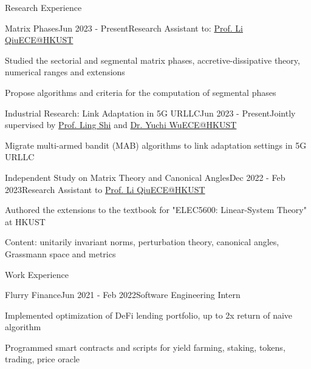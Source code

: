 \documentclass{resume}
\begin{document}
\begin{rSection}{Research Experience}

    \begin{rSubsection}{Matrix Phases}{Jun 2023 - Present}{Research Assistant to: \href{https://eeqiu.people.ust.hk/}{Prof. Li Qiu}}{\href{https://ece.hkust.edu.hk/}{ECE@HKUST}}
        \item Studied the sectorial and segmental matrix phases, accretive-dissipative theory, numerical ranges and extensions
        \item Propose algorithms and criteria for the computation of segmental phases
    \end{rSubsection}

    \begin{rSubsection}{Industrial Research: Link Adaptation in 5G URLLC}{Jun 2023 - Present}{Jointly supervised by \href{https://eesling.home.ece.ust.hk/}{Prof. Ling Shi} and \href{https://ieeexplore.ieee.org/author/37086153473}{Dr. Yuchi Wu}}{\href{https://ece.hkust.edu.hk/}{ECE@HKUST}}
        \item Migrate multi-armed bandit (MAB) algorithms to link adaptation settings in 5G URLLC
    \end{rSubsection}

    \begin{rSubsection}{Independent Study on Matrix Theory and Canonical Angles}{Dec 2022 - Feb 2023}{Research Assistant to \href{https://eeqiu.people.ust.hk/}{Prof. Li Qiu}}{\href{https://ece.hkust.edu.hk/}{ECE@HKUST}}
        \item Authored the extensions to the textbook for "ELEC5600: Linear-System Theory" at HKUST
        \item Content: unitarily invariant norms, perturbation theory, canonical angles, Grassmann space and metrics
    \end{rSubsection}

\end{rSection}

\begin{rSection}{Work Experience}

    \begin{rSubsection}{Flurry Finance}{Jun 2021 - Feb 2022}{Software Engineering Intern}{}
        \item Implemented optimization of DeFi lending portfolio, up to 2x return of naive algorithm
        \item Programmed smart contracts and scripts for yield farming, staking, tokens, trading, price oracle
    \end{rSubsection}

\end{rSection}
\end{document}
